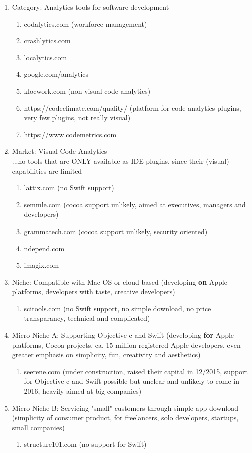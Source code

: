 \documentclass{article}
\begin{document}
\begin{enumerate}
	\item Category: Analytics tools for software development
	\begin{enumerate}
		\item codalytics.com (workforce management)
		\item crashlytics.com
		\item localytics.com
		\item google.com/analytics
		\item klocwork.com (non-visual code analytics)
		\item https://codeclimate.com/quality/ (platform for code analytics plugins, very few plugins, not really visual)
		\item https://www.codemetrics.com
	\end{enumerate}
	\item Market: Visual Code Analytics\\...no tools that are ONLY available as IDE plugins, since their (visual) capabilities are limited
	\begin{enumerate}
		\item lattix.com (no Swift support)
		\item semmle.com (cocoa support unlikely, aimed at executives, managers and developers)
		\item grammatech.com (cocoa support unlikely, security oriented)
		\item ndepend.com
		\item imagix.com
	\end{enumerate}
	\item Niche: Compatible with Mac OS or cloud-based (developing \textbf{on} Apple platforms, developers with taste, creative developers)
	\begin{enumerate}
		\item scitools.com (no Swift support, no simple download, no price transparancy, technical and complicated)
	\end{enumerate}
	\item Micro Niche A: Supporting Objective-c and Swift (developing \textbf{for} Apple platforms, Cocoa projects, ca. 15 million registered Apple developers, even greater emphasis on simplicity, fun, creativity and aesthetics)
	\begin{enumerate}
		\item seerene.com (under construction, raised their capital in 12/2015, support for Objective-c and Swift possible but unclear and unlikely to come in 2016, heavily aimed at big companies)
	\end{enumerate}
	\item Micro Niche B: Servicing "small" customers through simple app download (simplicity of consumer product, for freelancers, solo developers, startups, small companies)
	\begin{enumerate}
		\item structure101.com (no support for Swift)
	\end{enumerate}
\end{enumerate}
\end{document}
